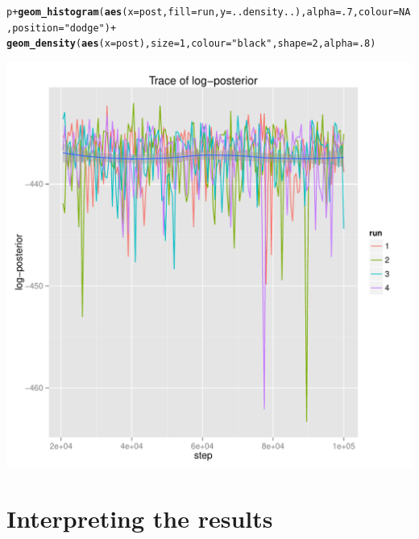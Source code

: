 \documentclass{article}\usepackage[]{graphicx}\usepackage[]{color}
\makeatletter
\newcommand{\hlnum}[1]{\textcolor[rgb]{0.686,0.059,0.569}{#1}}%
\newcommand{\hlstr}[1]{\textcolor[rgb]{0.192,0.494,0.8}{#1}}%
\newcommand{\hlopt}[1]{\textcolor[rgb]{0,0,0}{#1}}%
\newcommand{\hlstd}[1]{\textcolor[rgb]{0.345,0.345,0.345}{#1}}%
\newcommand{\hlkwc}[1]{\textcolor[rgb]{0.333,0.667,0.333}{#1}}%
\newcommand{\hlkwd}[1]{\textcolor[rgb]{0.737,0.353,0.396}{\textbf{#1}}}%
\newenvironment{kframe}{%
 \def\at@end@of@kframe{}%
 \ifinner\ifhmode%
  \def\at@end@of@kframe{\end{minipage}}%
  \begin{minipage}{\columnwidth}%
 \fi\fi%
 \def\FrameCommand##1{\hskip\@totalleftmargin \hskip-\fboxsep
 \colorbox{shadecolor}{##1}\hskip-\fboxsep
     \hskip-\linewidth \hskip-\@totalleftmargin \hskip\columnwidth}%
 \MakeFramed {\advance\hsize-\width
   \@totalleftmargin\z@ \linewidth\hsize
   \@setminipage}}%
 {\par\unskip\endMakeFramed%
 \at@end@of@kframe}
\newenvironment{knitrout}{}{} %
\makeatother
\begin{document}
\begin{knitrout}
\color{fgcolor}\begin{kframe}
\begin{alltt}
\hlstd{p} \hlopt{+} \hlkwd{geom_histogram}\hlstd{(}\hlkwd{aes}\hlstd{(}\hlkwc{x}\hlstd{=post,} \hlkwc{fill}\hlstd{=run,} \hlkwc{y}\hlstd{=..density..),} \hlkwc{alpha}\hlstd{=}\hlnum{.7}\hlstd{,} \hlkwc{colour}\hlstd{=}\hlnum{NA}\hlstd{,} \hlkwc{position}\hlstd{=}\hlstr{"dodge"}\hlstd{)} \hlopt{+}
    \hlkwd{geom_density}\hlstd{(}\hlkwd{aes}\hlstd{(}\hlkwc{x}\hlstd{=post),} \hlkwc{size}\hlstd{=}\hlnum{1}\hlstd{,} \hlkwc{colour}\hlstd{=}\hlstr{"black"}\hlstd{,} \hlkwc{shape}\hlstd{=}\hlnum{2}\hlstd{,} \hlkwc{alpha}\hlstd{=}\hlnum{.8}\hlstd{)}
\end{alltt}


{\ttfamily\noindent\itshape\color{messagecolor}{\#\# stat\_bin: binwidth defaulted to range/30. Use 'binwidth = x' to adjust this.}}\end{kframe}

{\centering \includegraphics[width=.6\textwidth]{figs/unnamed-chunk-16} 

}



\end{knitrout}







\section{Interpreting the results}
\end{document}
